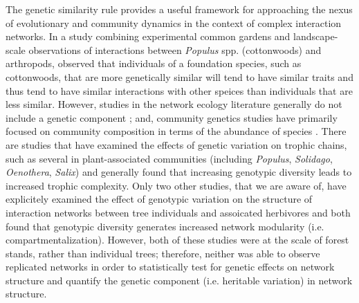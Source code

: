 \documentclass[11pt,twocolumn,twoside,lineno]{pnas-new}
\begin{document}
The genetic similarity rule provides a useful framework for
approaching the nexus of evolutionary and community dynamics in the
context of complex interaction networks. In a study combining
experimental common gardens and landscape-scale observations of
interactions between \textit{Populus} spp. (cottonwoods) and
arthropods, \citep{Bangert2006} observed that individuals of a
foundation species, such as cottonwoods, that are more genetically
similar will tend to have similar traits and thus tend to have similar
interactions with other speices than individuals that are less
similar. However, studies in the network ecology literature generally
do not include a genetic component \cite{Lau2017a}; and, community
genetics studies have primarily focused on community composition in
terms of the abundance of species
\cite{DesRoches2018TheVariation}. There are studies that have examined
the effects of genetic variation on trophic chains, such as several in
plant-associated communities (including \textit{Populus},
\textit{Solidago}, \textit{Oenothera}, \textit{Salix})
\cite{Bailey2005ImportanceInteractions, Johnson2008, Smith2011,
  Smith2015b, Barbour2016GeneticComplexity} and generally found that
increasing genotypic diversity leads to increased trophic
complexity. Only two other studies, that we are aware of, have
explicitely examined the effect of genotypic variation on the
structure of interaction networks between tree individuals and
assoicated herbivores \cite{Lau2015a, Keith2017} and both found that
genotypic diversity generates increased network modularity
(i.e. compartmentalization). However, both of these studies were at
the scale of forest stands, rather than individual trees; therefore,
neither was able to observe replicated networks in order to
statistically test for genetic effects on network structure and
quantify the genetic component (i.e. heritable variation) in network
structure.
\end{document}
